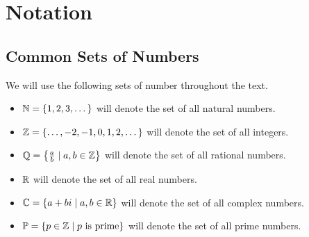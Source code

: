 

\chapter{Notation}
    \section{Common Sets of Numbers}
        \begin{definition}
            We will use the following sets of number throughout the text.
            \begin{itemize}
                \item
                    $\mathbb{N} = \left\{1, 2, 3, \dots\right\}$ will denote the set of all natural
                    numbers.
                \item
                    $\mathbb{Z} = \left\{\dots, -2, -1, 0, 1, 2, \dots\right\}$ will denote the set
                    of all integers.
                \item
                    $\mathbb{Q} = \left\{\frac{a}{b} \mid a, b \in \mathbb{Z}\right\}$ will denote the
                    set of all rational numbers.
                \item
                    $\mathbb{R}$ will denote the set of all real numbers.
                \item
                    $\mathbb{C} = \left\{a + bi \mid a, b \in \mathbb{R}\right\}$ will denote the set
                    of all complex numbers.
                \item
                    $\mathbb{P} = \left\{p \in \mathbb{Z} \mid p \mbox{ is prime}\right\}$ will denote
                    the set of all prime numbers.
            \end{itemize}
        \end{definition}

